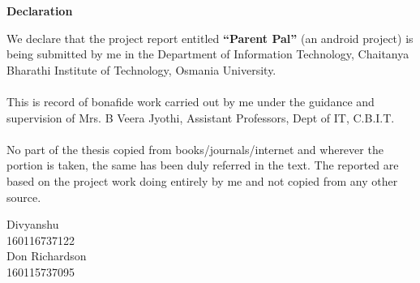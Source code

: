 \centerline{\LARGE \bfseries Declaration}
\vspace{0.5in}

We declare that the project report entitled \textbf{“Parent Pal”} (an android project) is being submitted by me in the Department of Information Technology, Chaitanya Bharathi Institute of Technology, Osmania University.\\ \\
This is record of bonafide work carried out by me under the guidance and supervision of Mrs. B Veera Jyothi, Assistant Professors, Dept of IT, C.B.I.T.\\ \\
No part of the thesis copied from books/journals/internet and wherever the portion is taken, the same has been duly referred in the text. The reported are based on the project work doing entirely by me and not copied from any other source.




\vspace{0.6in}

\begin{flushright}
Divyanshu\\
160116737122\\
Don Richardson\\
160115737095\\
\end{flushright}


\newpage

